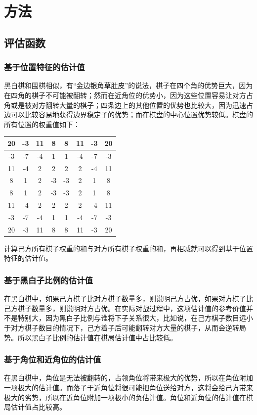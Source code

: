 \documentclass{article}
\begin{document}
\section{方法}
\subsection{评估函数}
\subsubsection{基于位置特征的估计值}
黑白棋和围棋相似，有“金边银角草肚皮”的说法，棋子在四个角的优势巨大，因为在四角的棋子不可能被翻转；然而在近角位的优势小，因为这些位置容易让对方占角或是被对方翻转大量的棋子；四条边上的其他位置的优势也比较大，因为迅速占边可以比较容易地获得边界稳定子的优势；而在棋盘的中心位置优势较低。棋盘的所有位置的权重值如下：
\begin{center}
    \begin{tabular}{|c|c|c|c|c|c|c|c|}
        \hline 20&-3&11&8&8&11&-3&20 \\
        \hline -3&-7&-4&1&1&-4&-7&-3 \\
        \hline 11&-4&2&2&2&2&-4&11 \\
        \hline 8&1&2&-3&-3&2&1&8 \\
        \hline 8&1&2&-3&-3&2&1&8 \\
        \hline 11&-4&2&2&2&2&-4&11 \\
        \hline -3&-7&-4&1&1&-4&-7&-3 \\
        \hline 20&-3&11&8&8&11&-3&20 \\
        \hline
    \end{tabular}
\end{center}
\par
计算己方所有棋子权重的和与对方所有棋子权重的和，再相减就可以得到基于位置特征的估计值。

\subsubsection{基于黑白子比例的估计值}
在黑白棋中，如果己方棋子比对方棋子数量多，则说明己方占优，如果对方棋子比己方棋子数量多，则说明对方占优。在实际对战过程中，这项估计值的参考价值并不是特别大，因为黑白子比例与谁将下子关系很大，比如说，在己方棋子数目远小于对方棋子数目的情况下，己方着子后可能翻转对方大量的棋子，从而会逆转局势。所以黑白子比例的估计值在棋局估计值中占比较低。

\subsubsection{基于角位和近角位的估计值}
在黑白棋中，角位是无法被翻转的，占领角位将带来极大的优势，所以在角位附加一项极大的估计值。而落子于近角位将很可能把角位送给对方，这将会给己方带来极大的劣势，所以在近角位附加一项极小的负估计值。角位和近角位的估计值在棋局估计值占比较高。
\end{document}
